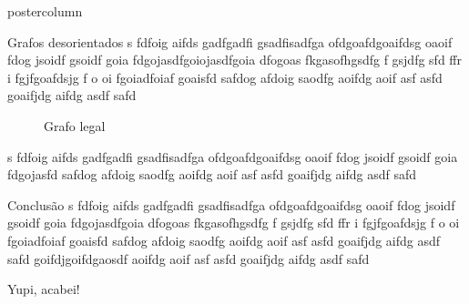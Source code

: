 \documentclass[final]{beamer}
\newlength{\columnheight}
\begin{document}
\begin{frame}
\begin{columns}
    \begin{column}{.5\textwidth}
      \begin{beamercolorbox}[center,wd=\textwidth]{postercolumn}
        \begin{minipage}[T]{.95\textwidth} %
          \parbox[t][\columnheight]{\textwidth}{ %
            
\vspace*{0.2cm} 
            \begin{block}{Grafos desorientados}
  s fdfoig aifds gadfgadfi gsadfisadfga ofdgoafdgoaifdsg oaoif   fdog jsoidf gsoidf goia fdgojasdfgoiojasdfgoia dfogoas fkgasofhgsdfg f gsjdfg sfd ffr i fgjfgoafdsjg f o oi fgoiadfoiaf goaisfd safdog afdoig saodfg aoifdg aoif asf asfd goaifjdg aifdg asdf safd            
                \begin{figure}
                \centering
                


                
                \caption{Grafo legal}
                \end{figure} 
s fdfoig aifds gadfgadfi gsadfisadfga ofdgoafdgoaifdsg oaoif   fdog jsoidf gsoidf goia fdgojasfd safdog afdoig saodfg aoifdg aoif asf asfd goaifjdg aifdg asdf safd              
\vspace*{0.2cm} 
            \end{block}
\vspace*{0.2cm} 
            \begin{block}{Conclusão}
                \justifying 
 s fdfoig aifds gadfgadfi gsadfisadfga ofdgoafdgoaifdsg oaoif   fdog jsoidf gsoidf goia fdgojasdfgoia dfogoas fkgasofhgsdfg f gsjdfg sfd ffr i fgjfgoafdsjg f o oi fgoiadfoiaf goaisfd safdog afdoig saodfg aoifdg aoif asf asfd goaifjdg aifdg asdf safd goifdjgoifdgaosdf  aoifdg aoif asf asfd goaifjdg aifdg asdf safd
               
Yupi, acabei!


\end{block}}
\end{minipage}
\end{beamercolorbox}
\end{column}
\end{columns}
\end{frame}
\end{document}

